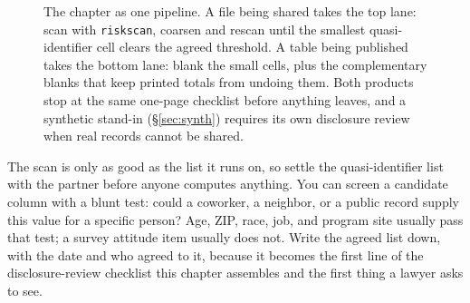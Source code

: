 \documentclass[
    a4paper,
    fontsize=10pt,
    twoside=true,
    numbers=noenddot,
]{kaobook}
\begin{document}
\begin{figure}[t]
\centering
{}
\caption[The release pipeline this chapter teaches]{The chapter as one pipeline. A file being shared takes the top lane: scan with \texttt{riskscan}, coarsen and rescan until the smallest quasi-identifier cell clears the agreed threshold. A table being published takes the bottom lane: blank the small cells, plus the complementary blanks that keep printed totals from undoing them. Both products stop at the same one-page checklist before anything leaves, and a synthetic stand-in (\S\ref{sec:synth}) requires its own disclosure review when real records cannot be shared.}
\label{fig:ch14-viz-pipeline}
\end{figure}


The scan is only as good as the list it runs on, so settle the quasi-identifier list with the partner before anyone computes anything. You can screen a candidate column with a blunt test: could a coworker, a neighbor, or a public record supply this value for a specific person? Age, ZIP, race, job, and program site usually pass that test; a survey attitude item usually does not. Write the agreed list down, with the date and who agreed to it, because it becomes the first line of the disclosure-review checklist this chapter assembles and the first thing a lawyer asks to see.
\end{document}
